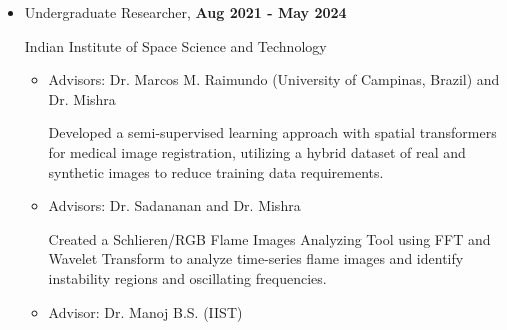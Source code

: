 \documentclass[11pt]{article}
\begin{document}
\begin{itemize}[leftmargin=*,noitemsep,topsep=0pt]
\begin{comment}
			\item Undergraduate Researcher, \hfill \textbf{Aug 2021 - May 2024} \\
	Indian Institute of Space Science and Technology
	\begin{itemize}[leftmargin=*,noitemsep,topsep=0pt]
		\item Collaborated with Dr. Marcos M. Raimundo (University of Campinas, Brazil) and Dr. Mishra to develop a semi-supervised learning approach with spatial transformers for medical image registration, utilizing a hybrid dataset of real and synthetic images to reduce training data requirements while leveraging transfer learning to curtail computational overhead.	
		\item Created and validated a Schlieren/RGB Flame Images Analyzing Tool based on Fast Fourier Transform (FFT) and Wavelet Transform to analyze time-series flame images to identify the region of instability and the corresponding oscillating frequency in collaboration with Dr. Rajesh
		Sadananan (IIST).
		\item Collaborated with Dr. Manoj B.S. (IIST) on a Complex Network Analysis project, focusing on the OPEC Crude Oil Trade Network. Utilized graph theory to model global crude oil flows between nations, identifying key time-series trends and predicting potential fluctuations in price and demand.
	\end{itemize}
	\end{itemize}
\end{comment}
	
	\item Undergraduate Researcher, \hfill \textbf{Aug 2021 - May 2024}
	
	Indian Institute of Space Science and Technology
	
	\begin{itemize}[leftmargin=*,noitemsep,topsep=0pt]
		\item Advisors: Dr. Marcos M. Raimundo (University of Campinas, Brazil) and Dr. Mishra

		
Developed a semi-supervised learning approach with spatial transformers for medical image registration, utilizing a hybrid dataset of real and synthetic images to reduce training data requirements.
		\item Advisors: Dr. Sadananan and Dr. Mishra
		
Created a Schlieren/RGB Flame Images Analyzing Tool using FFT and Wavelet Transform to analyze time-series flame images and identify instability regions and oscillating frequencies.
		\item Advisor: Dr. Manoj B.S. (IIST) 
		

\end{itemize}
\end{itemize}
\end{document}
